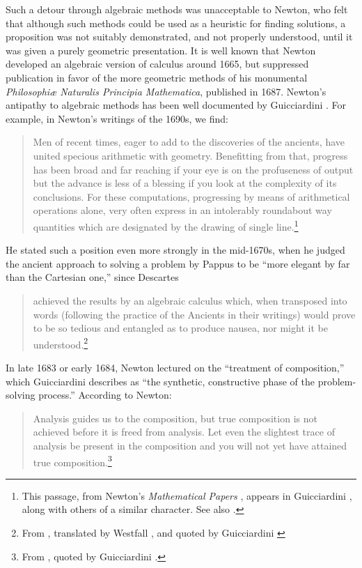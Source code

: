 \documentclass[12pt]{amsart}
\theoremstyle{definition}
\theoremstyle{remark}
\numberwithin{equation}{section}
\begin{document}
Such a detour through algebraic methods was unacceptable to Newton, who felt that although such methods could be used as a heuristic for finding solutions, a proposition was not suitably demonstrated, and not properly understood, until it was given a purely geometric presentation. It is well known that Newton developed an algebraic version of calculus around 1665, but suppressed publication in favor of the more geometric methods of his monumental \emph{Philosophi{\ae} Naturalis Principia Mathematica}, published in 1687. Newton's antipathy to algebraic methods has been well documented by Guicciardini \cite{guicciardini:99,guicciardini:09}. For example, in Newton's writings of the 1690s, we find:
\begin{quote}
Men of recent times, eager to add to the discoveries of the ancients, have united specious arithmetic with geometry. Benefitting from that, progress has been broad and far reaching if your eye is on the profuseness of output but the advance is less of a blessing if you look at the complexity of its conclusions. For these computations, progressing by means of arithmetical operations alone, very often express in an intolerably roundabout way quantities which are designated by the drawing of single line.\footnote{This passage, from Newton's \emph{Mathematical Papers} \cite[vol.~7, p.~251]{newton:mp}, appears in Guicciardini \cite[Section 4.6]{guicciardini:09}, along with others of a similar character. See also \cite[Chapter 2]{guicciardini:09}.}
\end{quote}
He stated such a position even more strongly in the mid-1670s, when he judged the ancient approach to solving a problem by Pappus to be ``more elegant by far than the Cartesian one,'' since Descartes
\begin{quote}
achieved the results by an algebraic calculus which, when transposed into words (following the practice of the Ancients in their writings) would prove to be so tedious and entangled as to produce nausea, nor might it be understood.\footnote{From \cite[vol.~4, p.~277]{newton:mp}, translated by Westfall \cite[p.~379]{westfall:80}, and quoted by Guicciardini \cite[p.~29]{guicciardini:99}}
\end{quote}
In late 1683 or early 1684, Newton lectured on the ``treatment of composition,'' which Guicciardini describes as ``the synthetic, constructive phase of the problem-solving process.'' According to Newton:
\begin{quote}
Analysis guides us to the composition, but true composition is not achieved before it is freed from analysis. Let even the slightest trace of analysis be present in the composition and you will not yet have attained true composition.\footnote{From \cite[vol.~4, p.~477]{newton:mp}, quoted by Guicciardini \cite[pp.74--75]{guicciardini:09}.}
\end{quote}
\end{document}
